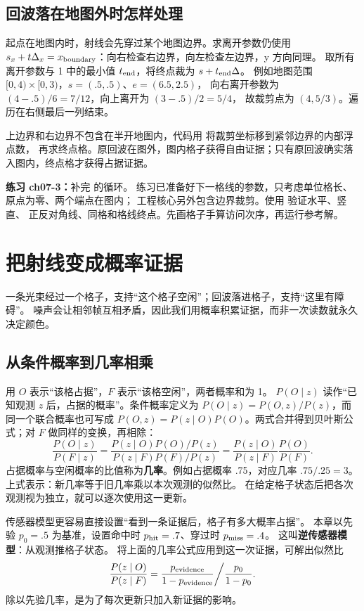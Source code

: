 \subsection{回波落在地图外时怎样处理}
起点在地图内时，射线会先穿过某个地图边界。求离开参数仍使用
$s_x+t\Delta_x=x_{\rm boundary}$：向右检查右边界，向左检查左边界，y 方向同理。
取所有离开参数与 1 中的最小值 $t_{\rm end}$，将终点裁为 $s+t_{\rm end}\Delta$。
例如地图范围 $[0,4)\times[0,3)$，$s=(.5,.5)$、$e=(6.5,2.5)$，
向右离开参数为 $(4-.5)/6=7/12$，向上离开为 $(3-.5)/2=5/4$，
故裁剪点为 $(4,5/3)$。遍历在右侧最后一列结束。

上边界和右边界不包含在半开地图内，代码用  将裁剪坐标移到紧邻边界的内部浮点数，
再求终点格。原回波在图外，图内格子获得自由证据；只有原回波确实落入图内，终点格才获得占据证据。

\textbf{练习 ch07-3：}补完  的循环。
练习已准备好下一格线的参数，只考虑单位格长、原点为零、两个端点在图内；
工程核心另外包含边界裁剪。使用  验证水平、竖直、
正反对角线、同格和格线终点。先画格子手算访问次序，再运行参考解。

\section{把射线变成概率证据}
一条光束经过一个格子，支持“这个格子空闲”；回波落进格子，支持“这里有障碍”。
噪声会让相邻帧互相矛盾，因此我们用概率积累证据，而非一次读数就永久决定颜色。

\subsection{从条件概率到几率相乘}
用 $O$ 表示“该格占据”，$F$ 表示“该格空闲”，两者概率和为 1。
$P(O\mid z)$ 读作“已知观测 $z$ 后，占据的概率”。条件概率定义为
$P(O\mid z)=P(O,z)/P(z)$，而同一个联合概率也可写成
$P(O,z)=P(z\mid O)P(O)$。两式合并得到贝叶斯公式；对 $F$ 做同样的变换，再相除：
\begin{equation}
\frac{P(O\mid z)}{P(F\mid z)}
=\frac{P(z\mid O)P(O)/P(z)}{P(z\mid F)P(F)/P(z)}
=\frac{P(z\mid O)}{P(z\mid F)}\frac{P(O)}{P(F)}.
\end{equation}
占据概率与空闲概率的比值称为\textbf{几率}。例如占据概率 .75，对应几率 $.75/.25=3$。
上式表示：新几率等于旧几率乘以本次观测的似然比。
在给定格子状态后把各次观测视为独立，就可以逐次使用这一更新。

传感器模型更容易直接设置“看到一条证据后，格子有多大概率占据”。
本章以先验 $p_0=.5$ 为基准，设置命中时 $p_{\rm hit}=.7$、穿过时 $p_{\rm miss}=.4$。
这叫\textbf{逆传感器模型}：从观测推格子状态。
将上面的几率公式应用到这一次证据，可解出似然比
\begin{equation}
\frac{P(z\mid O)}{P(z\mid F)}
=\frac{p_{\rm evidence}}{1-p_{\rm evidence}}
 \bigg/\frac{p_0}{1-p_0}.
\end{equation}
除以先验几率，是为了每次更新只加入新证据的影响。

